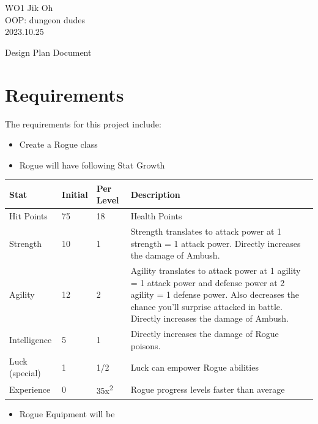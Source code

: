 \documentclass[12pt]{article} %
\begin{document}
\begin{flushright}
        WO1 Jik Oh\\
        OOP: dungeon dudes\\
        2023.10.25\\
\end{flushright}

\begin{center}
        {\huge Design Plan Document}
\end{center}

\section{Requirements}

The requirements for this project include:


\begin{itemize}
        \item Create a Rogue class
        \item Rogue will have following Stat Growth
\end{itemize}

\begin{footnotesize}
\begin{center}
\begin{tabular}{ | m{3cm} | m{1cm} | m{1cm} | m{8cm} |  }
\hline
Stat & Initial & Per Level & Description \\
\hline
Hit Points & 75 & 18 & Health Points \\
\hline
Strength & 10 & 1 & Strength translates to attack power at 1 strength = 1 attack power. Directly increases the damage of Ambush. \\
\hline
Agility & 12 & 2 & Agility translates to attack power at 1 agility = 1 attack power and defense power at 2 agility = 1 defense power. Also decreases the chance you'll surprise attacked in battle. Directly increases the damage of Ambush. \\
\hline
Intelligence & 5 & 1 & Directly increases the damage of Rogue poisons. \\
\hline
Luck (special) & 1 & 1/2 & Luck can empower Rogue abilities \\
\hline
Experience & 0 & 35x\textsuperscript{2} & Rogue progress levels faster than average \\
\hline
\end{tabular}
\end{center}
\end{footnotesize}

\begin{itemize}
    \item Rogue Equipment will be
\end{itemize}
\end{document}
